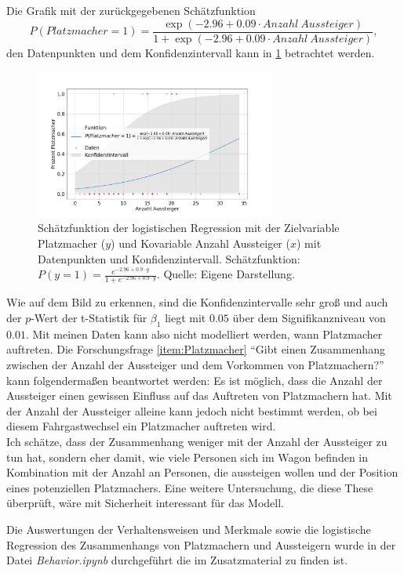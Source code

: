 Die Grafik mit der zurückgegebenen Schätzfunktion $$P(Platzmacher=1) = \frac{\exp(-2.96+0.09 \cdot Anzahl \ Aussteiger)}{1+\exp(-2.96+0.09 \cdot Anzahl \ Aussteiger)},$$
den Datenpunkten und dem Konfidenzintervall kann in \figurename \ref{fig:LogRegPM} betrachtet werden.
\begin{figure}[H]
	\centering
		\includegraphics[width=0.7\textwidth]{pictures/data_evaluation/behavior/log_reg_spacemaker.png}
	\caption{Schätzfunktion der logistischen Regression mit der Zielvariable Platzmacher ($y$) und Kovariable Anzahl Aussteiger ($x$) mit Datenpunkten und Konfidenzintervall. Schätzfunktion: $P(y=1) = \frac{e^{-2.96+0.9 \cdot y}}{1 + e^{-2.96 + 0.9 \cdot y}}$. Quelle: Eigene Darstellung.}
	\label{fig:LogRegPM}
\end{figure}
Wie auf dem Bild zu erkennen, sind die Konfidenzintervalle sehr groß und auch der $p$-Wert der t-Statistik für $\beta_1$ liegt mit $0.05$ über dem Signifikanzniveau von $0.01$. Mit meinen Daten kann also nicht modelliert werden, wann Platzmacher auftreten. Die Forschungsfrage \ref{item:Platzmacher} "`Gibt einen Zusammenhang zwischen der Anzahl der Aussteiger und dem Vorkommen von Platzmachern?"' kann folgendermaßen beantwortet werden:
Es ist möglich, dass die Anzahl der Aussteiger einen gewissen Einfluss auf das Auftreten von Platzmachern hat. Mit der Anzahl der Aussteiger alleine kann jedoch nicht bestimmt werden, ob bei diesem Fahrgastwechsel ein Platzmacher auftreten wird.\\
Ich schätze, dass der Zusammenhang weniger mit der Anzahl der Aussteiger zu tun hat, sondern eher damit, wie viele Personen sich im Wagon befinden in Kombination mit der Anzahl an Personen, die aussteigen wollen und der Position eines potenziellen Platzmachers. Eine weitere Untersuchung, die diese These überprüft, wäre mit Sicherheit interessant für das Modell.

Die Auswertungen der Verhaltensweisen und Merkmale sowie die logistische Regression des Zusammenhangs von Platzmachern und Aussteigern wurde in der Datei \textsl{Behavior.ipynb} durchgeführt die im Zusatzmaterial zu finden ist.

